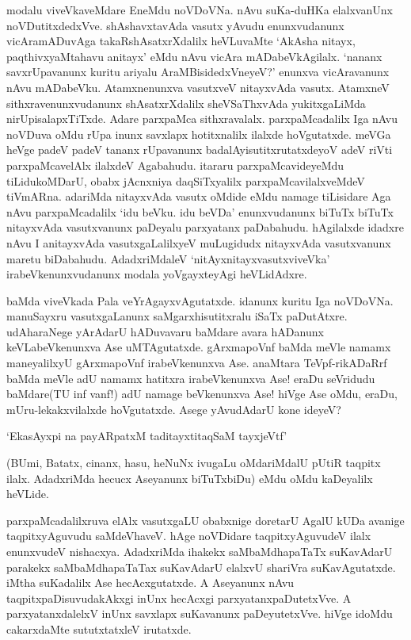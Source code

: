 modalu viveVkaveMdare EneMdu noVDoVNa. nAvu suKa-duHKa elalxvanUnx noVDutitxdedxVve. shAshavxtavAda vasutx yAvudu enunxvudanunx vicAramADuvAga takaRshAsatxrXdalilx heVLuvaMte `AkAsha nitayx, paqthivxyaMtahavu anitayx' eMdu nAvu vicAra mADabeVkAgilalx. `nananx savxrUpavanunx kuritu ariyalu AraMBisidedxVneyeV?' enunxva vicAravanunx nAvu mADabeVku. Atamxnenunxva vasutxveV nitayxvAda vasutx. AtamxneV sithxravenunxvudanunx shAsatxrXdalilx sheVSaThxvAda yukitxgaLiMda nirUpisalapxTiTxde. Adare parxpaMca sithxravalalx. parxpaMcadalilx Iga nAvu noVDuva oMdu rUpa inunx savxlapx hotitxnalilx ilalxde hoVgutatxde. meVGa heVge padeV padeV tananx rUpavanunx badalAyisutitxrutatxdeyoV adeV riVti parxpaMcavelAlx ilalxdeV Agabahudu. itararu parxpaMcavideyeMdu tiLidukoMDarU, obabx jAcnxniya daqSiTxyalilx parxpaMcavilalxveMdeV tiVmARna. adariMda nitayxvAda vasutx oMdide eMdu namage tiLisidare Aga nAvu parxpaMcadalilx `idu beVku. idu beVDa' enunxvudanunx biTuTx biTuTx nitayxvAda vasutxvanunx paDeyalu parxyatanx paDabahudu. hAgilalxde idadxre nAvu I anitayxvAda vasutxgaLalilxyeV muLugidudx nitayxvAda vasutxvanunx maretu biDabahudu. AdadxriMdaleV `nitAyxnitayxvasutxviveVka' irabeVkenunxvudanunx modala yoVgayxteyAgi heVLidAdxre.

baMda viveVkada Pala veYrAgayxvAgutatxde. idanunx kuritu Iga noVDoVNa. manuSayxru vasutxgaLanunx saMgarxhisutitxralu iSaTx paDutAtxre. udAharaNege yArAdarU hADuvavaru baMdare avara hADanunx keVLabeVkenunxva Ase uMTAgutatxde. gArxmapoVnf baMda meVle namamx maneyalilxyU gArxmapoVnf irabeVkenunxva Ase. anaMtara TeVpf-rikADaRrf baMda meVle adU namamx hatitxra irabeVkenunxva Ase! eraDu seVridudu baMdare(TU inf vanf!) adU namage beVkenunxva Ase! hiVge Ase oMdu, eraDu, mUru-lekakxvilalxde hoVgutatxde. Asege yAvudAdarU kone ideyeV?

\begin{shloka}
`EkasAyxpi na payARpatxM taditayxtitaqSaM tayxjeVtf'
\end{shloka}

(BUmi, Batatx, cinanx, hasu, heNuNx ivugaLu oMdariMdalU pUtiR taqpitx ilalx. AdadxriMda hecucx Aseyanunx biTuTxbiDu) eMdu oMdu kaDeyalilx heVLide.

parxpaMcadalilxruva elAlx vasutxgaLU obabxnige doretarU AgalU kUDa avanige taqpitxyAguvudu saMdeVhaveV. hAge noVDidare taqpitxyAguvudeV ilalx enunxvudeV nishacxya. AdadxriMda ihakekx saMbaMdhapaTaTx suKavAdarU parakekx saMbaMdhapaTaTax suKavAdarU elalxvU shariVra suKavAgutatxde. iMtha suKadalilx Ase hecAcxgutatxde. A Aseyanunx nAvu taqpitxpaDisuvudakAkxgi inUnx hecAcxgi parxyatanxpaDutetxVve. A parxyatanxdalelxV inUnx savxlapx suKavanunx paDeyutetxVve. hiVge idoMdu cakarxdaMte sututxtatxleV irutatxde.

